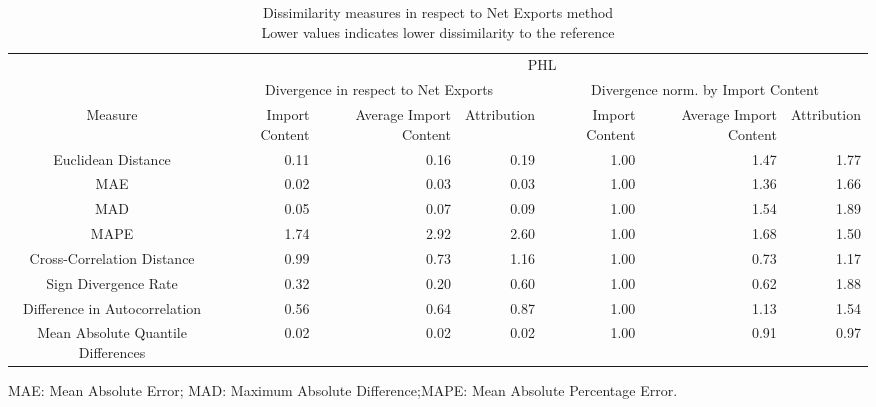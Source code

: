 \begin{table}[t]
\caption*{
{\large Dissimilarity measures in respect to Net Exports method} \\ 
{\small Lower values indicates lower dissimilarity to the reference}
} 
\fontsize{15.0pt}{18.0pt}\selectfont
\begin{tabular*}{\linewidth}{@{\extracolsep{\fill}}crrrrrr}
\toprule
 & \multicolumn{6}{c}{PHL} \\ 
\cmidrule(lr){2-7}
 & \multicolumn{3}{c}{Divergence in respect to Net Exports} & \multicolumn{3}{c}{Divergence norm. by Import Content} \\ 
\cmidrule(lr){2-4} \cmidrule(lr){5-7}
Measure & Import Content & Average Import Content & Attribution & Import Content & Average Import Content & Attribution \\ 
\midrule\addlinespace[2.5pt]
Euclidean Distance & 0.11 & 0.16 & 0.19 & 1.00 & 1.47 & 1.77 \\ 
MAE & 0.02 & 0.03 & 0.03 & 1.00 & 1.36 & 1.66 \\ 
MAD & 0.05 & 0.07 & 0.09 & 1.00 & 1.54 & 1.89 \\ 
MAPE & 1.74 & 2.92 & 2.60 & 1.00 & 1.68 & 1.50 \\ 
Cross-Correlation Distance & 0.99 & 0.73 & 1.16 & 1.00 & 0.73 & 1.17 \\ 
Sign Divergence Rate & 0.32 & 0.20 & 0.60 & 1.00 & 0.62 & 1.88 \\ 
Difference in Autocorrelation & 0.56 & 0.64 & 0.87 & 1.00 & 1.13 & 1.54 \\ 
Mean Absolute Quantile Differences & 0.02 & 0.02 & 0.02 & 1.00 & 0.91 & 0.97 \\ 
\bottomrule
\end{tabular*}
\begin{minipage}{\linewidth}
MAE: Mean Absolute Error; MAD: Maximum Absolute Difference;MAPE: Mean Absolute Percentage Error.\\
\end{minipage}
\end{table}

